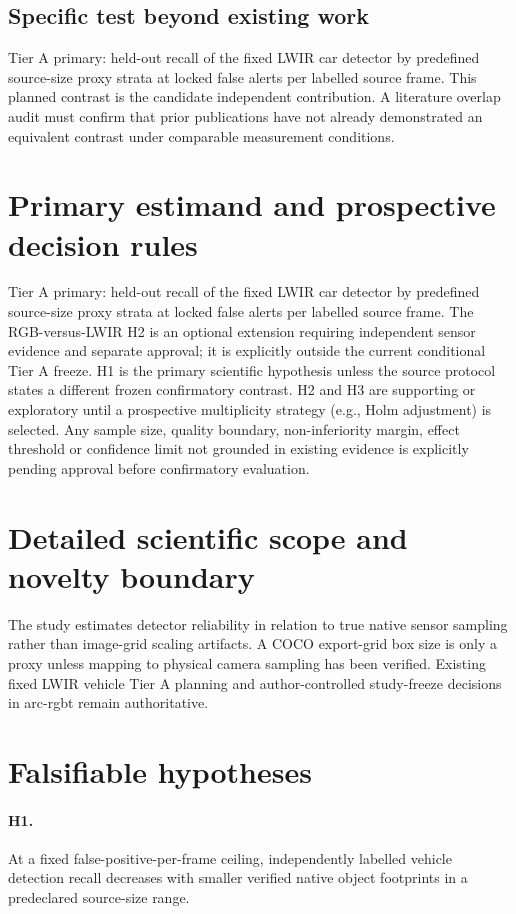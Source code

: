 \documentclass[11pt,a4paper]{article}
\begin{document}
\subsection{Specific test beyond existing work}
Tier A primary: held-out recall of the fixed LWIR car detector by predefined source-size proxy strata at locked false alerts per labelled source frame. This planned contrast is the candidate independent contribution. A literature overlap audit must confirm that prior publications have not already demonstrated an equivalent contrast under comparable measurement conditions.

\section{Primary estimand and prospective decision rules}
Tier A primary: held-out recall of the fixed LWIR car detector by predefined source-size proxy strata at locked false alerts per labelled source frame. The RGB-versus-LWIR H2 is an optional extension requiring independent sensor evidence and separate approval; it is explicitly outside the current conditional Tier A freeze. H1 is the primary scientific hypothesis unless the source protocol states a different frozen confirmatory contrast. H2 and H3 are supporting or exploratory until a prospective multiplicity strategy (e.g., Holm adjustment) is selected. Any sample size, quality boundary, non-inferiority margin, effect threshold or confidence limit not grounded in existing evidence is explicitly pending approval before confirmatory evaluation.

\section{Detailed scientific scope and novelty boundary}
The study estimates detector reliability in relation to true native sensor sampling rather than image-grid scaling artifacts. A COCO export-grid box size is only a proxy unless mapping to physical camera sampling has been verified. Existing fixed LWIR vehicle Tier A planning and author-controlled study-freeze decisions in arc-rgbt remain authoritative.

\section{Falsifiable hypotheses}
\paragraph{H1.} At a fixed false-positive-per-frame ceiling, independently labelled vehicle detection recall decreases with smaller verified native object footprints in a predeclared source-size range.
\end{document}
